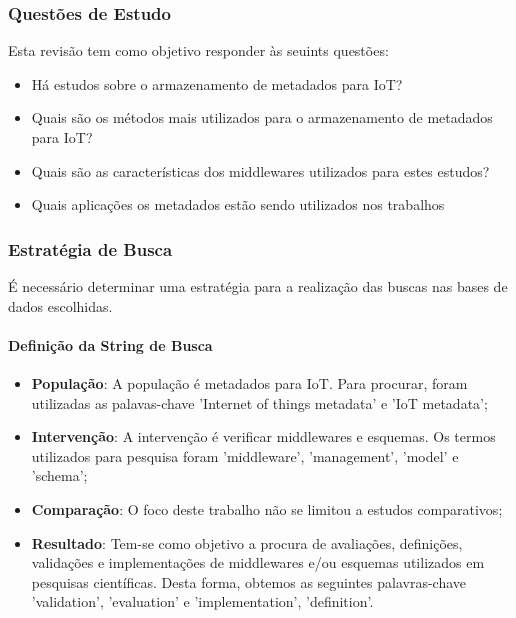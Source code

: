\subsubsection{Questões de Estudo}
Esta revisão tem como objetivo responder às seuints questões:
\begin{itemize}
  \item Há estudos sobre o armazenamento de metadados para \acrlong{IoT}?
  \item Quais são os métodos mais utilizados para o armazenamento de metadados para \acrshort{IoT}?
  \item Quais são as características dos middlewares utilizados para estes estudos?
  \item Quais aplicações os metadados estão sendo utilizados nos trabalhos
\end{itemize}

\subsubsection{Estratégia de Busca}
É necessário determinar uma estratégia para a realização das buscas nas bases de dados escolhidas.

\paragraph{Definição da String de Busca}
\begin{itemize}
  \item \textbf{População}: A população é metadados para \acrshort{IoT}. Para procurar, foram utilizadas as palavas-chave 'Internet of things metadata' e 'IoT metadata';
  \item \textbf{Intervenção}: A intervenção é verificar middlewares e esquemas. Os termos utilizados para pesquisa foram 'middleware', 'management', 'model' e 'schema';
  \item \textbf{Comparação}: O foco deste trabalho não se limitou a estudos comparativos;
  \item \textbf{Resultado}: Tem-se como objetivo a procura de avaliações, definições, validações e implementações de middlewares e/ou esquemas utilizados em pesquisas científicas. Desta forma, obtemos as seguintes palavras-chave
  'validation', 'evaluation' e 'implementation', 'definition'.
\end{itemize}

